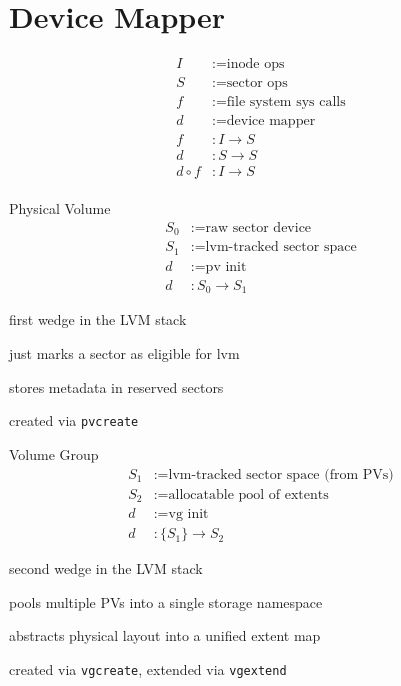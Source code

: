 \documentclass[openany, 12pt]{book}
\begin{document}
\chapter{Device Mapper}
\begin{align*}
	I         & := \text{inode ops}             \\
	S         & := \text{sector ops}            \\
	f         & := \text{file system sys calls} \\
	d         & := \text{device mapper}         \\
	f         & :  I \to S                      \\
	d         & :  S \to S                      \\
	d \circ f & : I \to S                       \\
\end{align*}

\begin{definition}{Physical Volume}{}
	\begin{align*}
		S_0 & := \text{raw sector device}        \\
		S_1 & := \text{lvm-tracked sector space} \\
		d   & := \text{pv init}                  \\
		d   & : S_0 \to S_1
	\end{align*}
	\begin{alist}
		\item first wedge in the LVM stack
		\item just marks a sector as eligible for lvm
		\item stores metadata in reserved sectors
		\item created via \texttt{pvcreate}
	\end{alist}
\end{definition}

\begin{definition}{Volume Group}{}
	\begin{align*}
		S_1 & := \text{lvm-tracked sector space (from PVs)} \\
		S_2 & := \text{allocatable pool of extents}         \\
		d   & := \text{vg init}                             \\
		d   & : \{S_1\} \to S_2
	\end{align*}
	\begin{alist}
		\item second wedge in the LVM stack
		\item pools multiple PVs into a single storage namespace
		\item abstracts physical layout into a unified extent map
		\item created via \texttt{vgcreate}, extended via \texttt{vgextend}
	\end{alist}
\end{definition}
\end{document}
